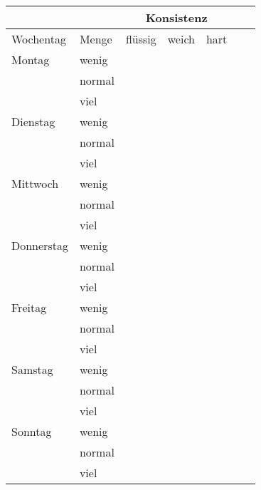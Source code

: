 \documentclass[11pt,a4paper]{article}
\begin{document}
\pagestyle{empty}
\centering
\begin{tabular}{l|l|l|l|l|p{3cm}|p{3cm}}
  \toprule
  \multicolumn{2}{c}{} & \multicolumn{3}{|c|}{Konsistenz} & & \\
  \midrule
  Wochentag  & Menge   & flüssig &  weich & hart  & & \\
  \midrule
  Montag     & wenig   &         &        &       & & \\
             & normal  &         &        &       & & \\
             & viel    &         &        &       & & \\
  \midrule
  Dienstag   & wenig   &         &        &       & & \\
             & normal  &         &        &       & & \\
             & viel    &         &        &       & & \\
  \midrule
  Mittwoch   & wenig   &         &        &       & & \\
             & normal  &         &        &       & & \\
             & viel    &         &        &       & & \\
  \midrule
  Donnerstag & wenig   &         &        &       & & \\
             & normal  &         &        &       & & \\
             & viel    &         &        &       & & \\
  \midrule
  Freitag    & wenig   &         &        &       & & \\
             & normal  &         &        &       & & \\
             & viel    &         &        &       & & \\
  \midrule
  Samstag    & wenig   &         &        &       & & \\
             & normal  &         &        &       & & \\
             & viel    &         &        &       & & \\
  \midrule
  Sonntag    & wenig   &         &        &       & & \\
             & normal  &         &        &       & & \\
             & viel    &         &        &       & & \\
  \bottomrule
\end{tabular}
\end{document}

